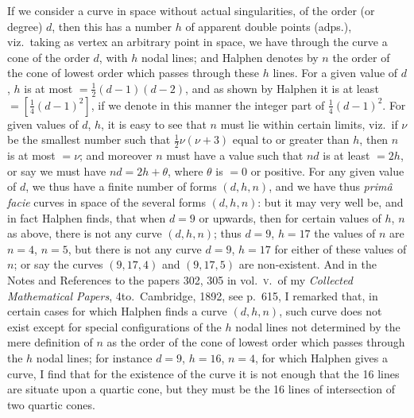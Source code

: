 \documentclass[11pt]{article}
\begin{document}
\noindent If we consider a curve in space without actual singularities, of the order (or degree) $d$, then this has a number $h$ of apparent double points (adps.), viz.\ taking as vertex an arbitrary point in space, we have through the curve a cone of the order $d$, with $h$ nodal lines; and Halphen denotes by $n$ the order of the cone of lowest order which passes through these $h$ lines.  For a given value of $d$, $h$ is at most $=\tfrac{1}{2}(d-1)(d-2)$, and as shown by Halphen it is at least $=[\tfrac{1}{4}(d-1)^{2}]$, if we denote in this manner the integer part of $\tfrac{1}{4}(d-1)^{2}$.  For given values of $d$, $h$, it is easy to see that $n$ must lie within certain limits, viz.\ if $\nu$ be the smallest number such that $\tfrac{1}{2}\nu(\nu+3)$ equal to or greater than $h$, then $n$ is at most $=\nu$; and moreover $n$ must have a value such that $nd$ is at least $=2h$, or say we must have $nd = 2h + \theta$, where $\theta$ is $=0$ or positive.  For any given value of $d$, we thus have a finite number of forms $(d, h, n)$, and we have thus \textit{prim\^a facie} curves in space of the several forms $(d, h, n)$: but it may very well be, and in fact Halphen finds, that when $d=9$ or upwards, then for certain values of $h$, $n$ as above, there is not any curve $(d, h, n)$; thus $d=9$, $h=17$ the values of $n$ are $n=4$, $n=5$, but there is not any curve $d=9$, $h=17$ for either of these values of $n$; or say the curves $(9, 17, 4)$ and $(9, 17, 5)$ are non-existent.  And in the Notes and References to the papers 302, 305 in vol.\ \textsc{v}.\ of my \textit{Collected Mathematical Papers}, 4to.\ Cambridge, 1892, see p.\ 615, I remarked that, in certain cases for which Halphen finds a curve $(d, h, n)$, such curve does not exist except for special configurations of the $h$ nodal lines not determined by the mere definition of $n$ as the order of the cone of lowest order which passes through the $h$ nodal lines; for instance $d=9$, $h=16$, $n=4$, for which Halphen gives a curve, I find that for the existence of the curve it is not enough that the 16 lines are situate upon a quartic cone, but they must be the 16 lines of intersection of two quartic cones.
\end{document}
